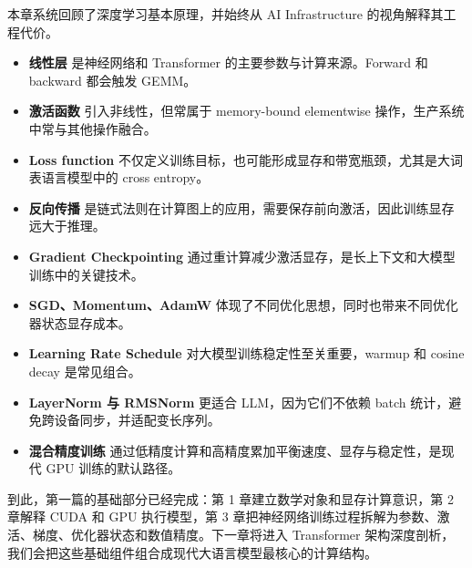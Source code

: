 本章系统回顾了深度学习基本原理，并始终从 AI Infrastructure 的视角解释其工程代价。

\begin{itemize}
\item \textbf{线性层} 是神经网络和 Transformer 的主要参数与计算来源。Forward 和 backward 都会触发 GEMM。
\item \textbf{激活函数} 引入非线性，但常属于 memory-bound elementwise 操作，生产系统中常与其他操作融合。
\item \textbf{Loss function} 不仅定义训练目标，也可能形成显存和带宽瓶颈，尤其是大词表语言模型中的 cross entropy。
\item \textbf{反向传播} 是链式法则在计算图上的应用，需要保存前向激活，因此训练显存远大于推理。
\item \textbf{Gradient Checkpointing} 通过重计算减少激活显存，是长上下文和大模型训练中的关键技术。
\item \textbf{SGD、Momentum、AdamW} 体现了不同优化思想，同时也带来不同优化器状态显存成本。
\item \textbf{Learning Rate Schedule} 对大模型训练稳定性至关重要，warmup 和 cosine decay 是常见组合。
\item \textbf{LayerNorm 与 RMSNorm} 更适合 LLM，因为它们不依赖 batch 统计，避免跨设备同步，并适配变长序列。
\item \textbf{混合精度训练} 通过低精度计算和高精度累加平衡速度、显存与稳定性，是现代 GPU 训练的默认路径。
\end{itemize}

到此，第一篇的基础部分已经完成：第 1 章建立数学对象和显存计算意识，第 2 章解释 CUDA 和 GPU 执行模型，第 3 章把神经网络训练过程拆解为参数、激活、梯度、优化器状态和数值精度。下一章将进入 Transformer 架构深度剖析，我们会把这些基础组件组合成现代大语言模型最核心的计算结构。
